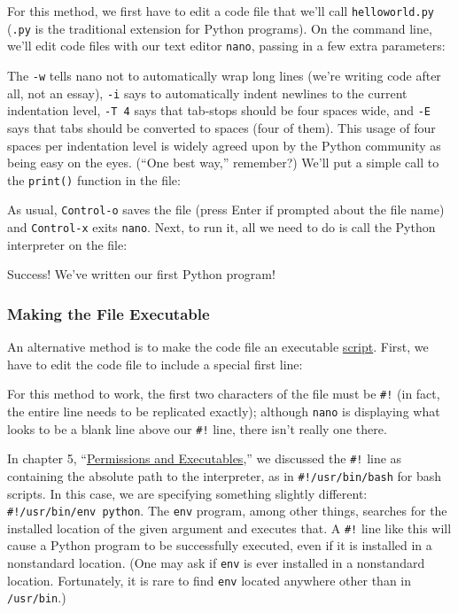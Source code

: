 \documentclass[
]{memoir}
\begin{document}
For this method, we first have to edit a code file that we'll call \texttt{helloworld.py} (\texttt{.py} is the traditional extension for Python programs). On the command line, we'll edit code files with our text editor \texttt{nano}, passing in a few extra parameters:

The \texttt{-w} tells nano not to automatically wrap long lines (we're writing code after all, not an essay), \texttt{-i} says to automatically indent newlines to the current indentation level, \texttt{-T\ 4} says that tab-stops should be four spaces wide, and \texttt{-E} says that tabs should be converted to spaces (four of them). This usage of four spaces per indentation level is widely agreed upon by the Python community as being easy on the eyes. (\enquote{One best way,} remember?) We'll put a simple call to the \texttt{print()} function in the file:

As usual, \texttt{Control-o} saves the file (press Enter if prompted about the file name) and \texttt{Control-x} exits \texttt{nano}. Next, to run it, all we need to do is call the Python interpreter on the file:

Success! We've written our first Python program!

\hypertarget{making-the-file-executable}{%
\subsubsection*{Making the File Executable}\label{making-the-file-executable}}

An alternative method is to make the code file an executable \protect\hyperlink{script_def}{script}. First, we have to edit the code file to include a special first line:

For this method to work, the first two characters of the file must be \texttt{\#!} (in fact, the entire line needs to be replicated exactly); although \texttt{nano} is displaying what looks to be a blank line above our \texttt{\#!} line, there isn't really one there.

In chapter 5, \enquote{\href{}{Permissions and Executables},} we discussed the \texttt{\#!} line as containing the absolute path to the interpreter, as in \texttt{\#!/usr/bin/bash} for bash scripts. In this case, we are specifying something slightly different: \texttt{\#!/usr/bin/env\ python}. The \texttt{env} program, among other things, searches for the installed location of the given argument and executes that. A \texttt{\#!} line like this will cause a Python program to be successfully executed, even if it is installed in a nonstandard location. (One may ask if \texttt{env} is ever installed in a nonstandard location. Fortunately, it is rare to find \texttt{env} located anywhere other than in \texttt{/usr/bin}.)
\end{document}
